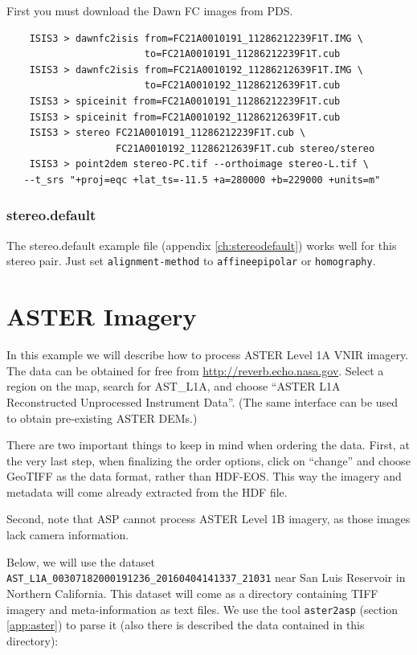 First you must download the Dawn FC images from PDS.

\begin{verbatim}
    ISIS3 > dawnfc2isis from=FC21A0010191_11286212239F1T.IMG \
                        to=FC21A0010191_11286212239F1T.cub
    ISIS3 > dawnfc2isis from=FC21A0010192_11286212639F1T.IMG \
                        to=FC21A0010192_11286212639F1T.cub
    ISIS3 > spiceinit from=FC21A0010191_11286212239F1T.cub
    ISIS3 > spiceinit from=FC21A0010192_11286212639F1T.cub
    ISIS3 > stereo FC21A0010191_11286212239F1T.cub \
                   FC21A0010192_11286212639F1T.cub stereo/stereo
    ISIS3 > point2dem stereo-PC.tif --orthoimage stereo-L.tif \
   --t_srs "+proj=eqc +lat_ts=-11.5 +a=280000 +b=229000 +units=m"
\end{verbatim}

\subsubsection*{stereo.default}

The stereo.default example file (appendix \ref{ch:stereodefault})
works well for this stereo pair. Just set
\texttt{alignment-method} to \texttt{affineepipolar} or
\texttt{homography}.


\section{ASTER Imagery}
\label{sec:aster}

In this example we will describe how to process ASTER Level 1A VNIR
imagery. The data can be obtained for free from
\url{http://reverb.echo.nasa.gov}. Select a region on the map, 
search for AST\_L1A, and choose ``ASTER L1A Reconstructed Unprocessed Instrument Data''.
(The same interface can be used to obtain pre-existing ASTER DEMs.)

There are two important things to keep in mind when ordering the data.
First, at the very last step, when finalizing the order options, click on
``change'' and choose GeoTIFF as the data format, rather than
HDF-EOS. This way the imagery and metadata will come already extracted from the HDF file.

Second, note that ASP cannot process ASTER Level 1B imagery, as those
images lack camera information.

Below, we will use the dataset
\texttt{AST\_L1A\_00307182000191236\_20160404141337\_21031} near San Luis
Reservoir in Northern California. This dataset will come as a directory
containing TIFF imagery and meta-information as text files. We use the
tool \texttt{aster2asp} (section \ref{app:aster}) to parse it (also
there is described the data contained in this directory):

